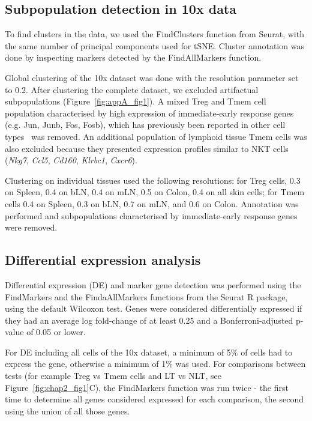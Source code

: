 \subsection{Subpopulation detection in 10x data}
To find clusters in the data, we used the FindClusters function from Seurat, with the same number of principal components used for tSNE. Cluster annotation was done by inspecting markers detected by the FindAllMarkers function.

Global clustering of the 10x dataset was done with the resolution parameter set to 0.2. After clustering the complete dataset, we excluded artifactual subpopulations (Figure~\ref{fig:appA_fig1}). A mixed Treg and Tmem cell population characterised by high expression of immediate-early response genes (e.g. Jun, Junb, Fos, Fosb), which has previously been reported in other cell types~\citep{Adam2017-wd,Van_den_Brink2017-lg,Wu2017-jn} was removed. An additional population of lymphoid tissue Tmem cells was also excluded because they presented expression profiles similar to NKT cells (\textit{Nkg7}, \textit{Ccl5}, \textit{Cd160}, \textit{Klrbc1}, \textit{Cxcr6}).

Clustering on individual tissues used the following resolutions: for Treg cells, 0.3 on Spleen, 0.4 on bLN, 0.4 on mLN, 0.5 on Colon, 0.4 on all skin cells; for Tmem cells 0.4 on Spleen, 0.3 on bLN, 0.7 on mLN, and 0.6 on Colon. Annotation was performed and subpopulations characterised by immediate-early response genes were removed.

\subsection{Differential expression analysis}
Differential expression (DE) and marker gene detection was performed using the FindMarkers and the FindaAllMarkers functions from the Seurat R package, using the default Wilcoxon test. Genes were considered differentially expressed if they had an average log fold-change of at least 0.25 and a Bonferroni-adjusted p-value of 0.05 or lower. 

For DE including all cells of the 10x dataset, a minimum of 5${\%}$ of cells had to express the gene, otherwise a minimum of 1${\%}$ was used. For comparisons between tests (for example Treg vs Tmem cells and LT vs NLT, see Figure~\ref{fig:chap2_fig1}C), the FindMarkers function was run twice - the first time to determine all genes considered expressed for each comparison, the second using the union of all those genes.

